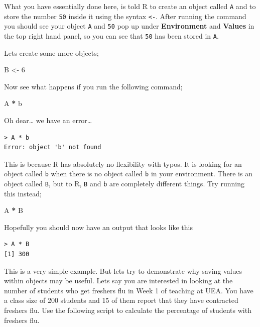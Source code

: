 \documentclass[
]{book}
\newenvironment{Shaded}{\begin{snugshade}}{\end{snugshade}}
\newcommand{\DecValTok}[1]{\textcolor[rgb]{0.00,0.00,0.81}{#1}}
\newcommand{\NormalTok}[1]{#1}
\newcommand{\OtherTok}[1]{\textcolor[rgb]{0.56,0.35,0.01}{#1}}
\newcommand{\SpecialCharTok}[1]{\textcolor[rgb]{0.81,0.36,0.00}{\textbf{#1}}}
\begin{document}
What you have essentially done here, is told R to create an object called \texttt{A} and to store the number \texttt{50} inside it using the syntax \texttt{\textless{}-}. After running the command you should see your object \texttt{A} and \texttt{50} pop up under \textbf{Environment} and \textbf{Values} in the top right hand panel, so you can see that \texttt{50} has been stored in \texttt{A}.

Lets create some more objects;

\begin{Shaded}
\begin{Highlighting}[]
\NormalTok{B }\OtherTok{\textless{}{-}} \DecValTok{6}
\end{Highlighting}
\end{Shaded}

Now see what happens if you run the following command;

\begin{Shaded}
\begin{Highlighting}[]
\NormalTok{A }\SpecialCharTok{*}\NormalTok{ b}
\end{Highlighting}
\end{Shaded}

Oh dear\ldots{} we have an error\ldots{}

\begin{verbatim}
> A * b
Error: object 'b' not found
\end{verbatim}

This is because R has absolutely no flexibility with typos. It is looking for an object called \texttt{b} when there is no object called \texttt{b} in your environment. There is an object called \texttt{B}, but to R, \texttt{B} and \texttt{b} are completely different things. Try running this instead;

\begin{Shaded}
\begin{Highlighting}[]
\NormalTok{A }\SpecialCharTok{*}\NormalTok{ B}
\end{Highlighting}
\end{Shaded}

Hopefully you should now have an output that looks like this

\begin{verbatim}
> A * B
[1] 300
\end{verbatim}

This is a very simple example. But lets try to demonstrate why saving values within objects may be useful. Lets say you are interested in looking at the number of students who get freshers flu in Week 1 of teaching at UEA. You have a class size of 200 students and 15 of them report that they have contracted freshers flu. Use the following script to calculate the percentage of students with freshers flu.
\end{document}
